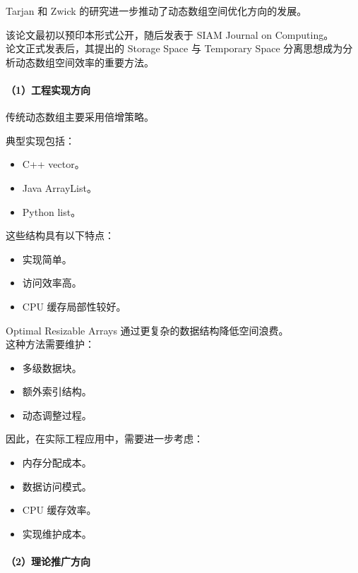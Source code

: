 \documentclass[
  UTF8,
  a4paper,
  12pt]{ctexart}
\begin{document}
Tarjan 和 Zwick 的研究进一步推动了动态数组空间优化方向的发展。

该论文最初以预印本形式公开，随后发表于 SIAM Journal on Computing。\\
论文正式发表后，其提出的 Storage Space 与 Temporary Space
分离思想成为分析动态数组空间效率的重要方法。

\paragraph{（1）工程实现方向}

传统动态数组主要采用倍增策略。

典型实现包括：

\begin{itemize}
\item
  C++ vector。
\item
  Java ArrayList。
\item
  Python list。
\end{itemize}

这些结构具有以下特点：

\begin{itemize}
\item
  实现简单。
\item
  访问效率高。
\item
  CPU 缓存局部性较好。
\end{itemize}

Optimal Resizable Arrays 通过更复杂的数据结构降低空间浪费。\\
这种方法需要维护：

\begin{itemize}
\item
  多级数据块。
\item
  额外索引结构。
\item
  动态调整过程。
\end{itemize}

因此，在实际工程应用中，需要进一步考虑：

\begin{itemize}
\item
  内存分配成本。
\item
  数据访问模式。
\item
  CPU 缓存效率。
\item
  实现维护成本。
\end{itemize}

\paragraph{（2）理论推广方向}
\end{document}
